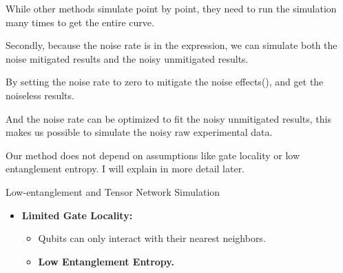 \documentclass[10pt]{beamer}
\begin{document}
\begin{CJK}{UTF8}{gbsn}
{  While other methods simulate point by point, they need to run the simulation many times to get the entire curve.

  Secondly, because the noise rate is in the expression, we can simulate both the noise mitigated results and the noisy unmitigated results.
  
  By setting the noise rate to zero to mitigate the noise effects(), and get the noiseless results. 

  And the noise rate can be optimized to fit the noisy unmitigated results, this makes us possible to simulate the noisy raw experimental data.

  Our method does not depend on assumptions like gate locality or low entanglement entropy. I will explain in more detail later.
}

\begin{frame}[fragile]{Low-entanglement and Tensor Network Simulation}

  \begin{itemize}
    \item \textbf{Limited Gate Locality:}
    \begin{itemize}
        \item Qubits can only interact with their nearest neighbors.
        \item \textbf{Low Entanglement Entropy.}
  \end{itemize}
\end{itemize}


\end{frame}
\end{CJK}
\end{document}
